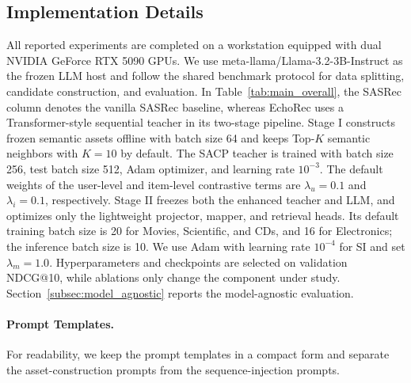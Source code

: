 ﻿\documentclass{article}
\begin{document}
\subsection{Implementation Details}
\label{app:implementation}

All reported experiments are completed on a workstation equipped with dual NVIDIA GeForce RTX 5090 GPUs. We use meta-llama/Llama-3.2-3B-Instruct as the frozen LLM host and follow the shared benchmark protocol for data splitting, candidate construction, and evaluation. In Table~\ref{tab:main_overall}, the SASRec column denotes the vanilla SASRec baseline, whereas EchoRec uses a Transformer-style sequential teacher in its two-stage pipeline. Stage I constructs frozen semantic assets offline with batch size 64 and keeps Top-$K$ semantic neighbors with $K=10$ by default. The SACP teacher is trained with batch size 256, test batch size 512, Adam optimizer, and learning rate $10^{-3}$. The default weights of the user-level and item-level contrastive terms are $\lambda_u=0.1$ and $\lambda_i=0.1$, respectively. Stage II freezes both the enhanced teacher and LLM, and optimizes only the lightweight projector, mapper, and retrieval heads. Its default training batch size is 20 for Movies, Scientific, and CDs, and 16 for Electronics; the inference batch size is 10. We use Adam with learning rate $10^{-4}$ for SI and set $\lambda_m=1.0$. Hyperparameters and checkpoints are selected on validation NDCG@10, while ablations only change the component under study. Section~\ref{subsec:model_agnostic} reports the model-agnostic evaluation.

\paragraph{Prompt Templates.}
For readability, we keep the prompt templates in a compact form and separate the asset-construction prompts from the sequence-injection prompts.
\end{document}
